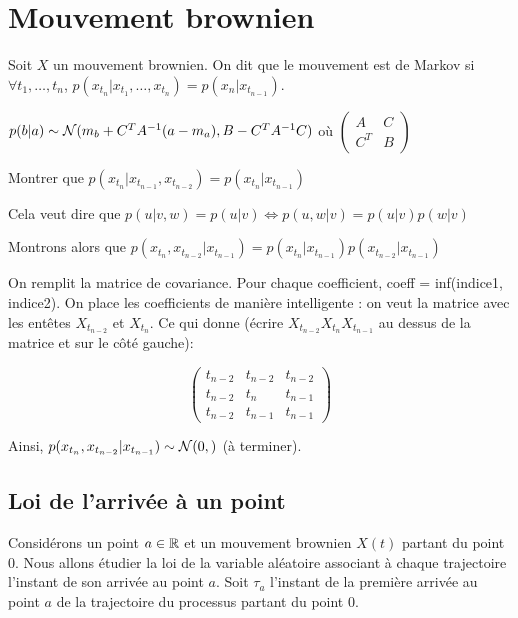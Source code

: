 \section{Mouvement brownien}

\Def Soit $X$ un mouvement brownien. On dit que le mouvement est de Markov si $\forall t_1,\ldots,t_n$, $p(x_{t_n}\vert x_{t_1}, \ldots, x_{t_n}) = p(x_n \vert x_{t_{n-1}})$.

\Prop $p(b\vert a) \sim \mathcal{N}(m_b + C^T A^{-1}(a-m_a), B - C^T A^{-1} C)$ où 
$
\begin{pmatrix}
A & C \\
C^T & B
\end{pmatrix}
$

 Montrer que $p(x_{t_n} \vert x_{t_{n-1}}, x_{t_{n-2}}) = p(x_{t_n} \vert x_{t_{n-1}})$

\Rq Cela veut dire que $p(u\vert v,w) = p(u \vert v) \Leftrightarrow p(u,w\vert v) = p(u\vert v)p(w \vert v)$

Montrons alors que $p(x_{t_n},x_{t_{n-2}} \vert x_{t_{n-1}}) = p(x_{t_n}\vert x_{t_{n-1}})p(x_{t_{n-2}} \vert x_{t_{n-1}})$ 

On remplit la matrice de covariance. Pour chaque coefficient, \og coeff = inf(indice1, indice2)\fg{}. On place les coefficients de manière \og intelligente \fg{} : on veut la matrice avec les entêtes $X_{t_{n-2}}$ et $X_{t_n}$. Ce qui donne (écrire $X_{t_{n-2}} X_{t_n} X_{t_{n-1}}$ au dessus de la matrice et sur le côté gauche): 

\[
\begin{pmatrix}
  t_{n-2} & t_{n-2} & t_{n-2} \\
  t_{n-2} & t_{n}   & t_{n-1} \\
  t_{n-2} & t_{n-1} & t_{n-1}
\end{pmatrix}
\]

Ainsi, $p(x_{t_n}, x_{t_{n-2}} \vert x_{t_{n-1}}) \sim \mathcal{N}(0,)$ (à terminer).


\subsection{Loi de l'arrivée à un point}
Considérons un point $a\in \mathbb{R}$ et un mouvement brownien $X(t)$ partant du point $0$. Nous allons étudier la loi de la variable aléatoire associant à chaque trajectoire l'instant de son arrivée au point $a$. Soit $\tau_a$ l'instant de la première arrivée au point $a$ de la trajectoire du processus partant du point $0$.  \\

